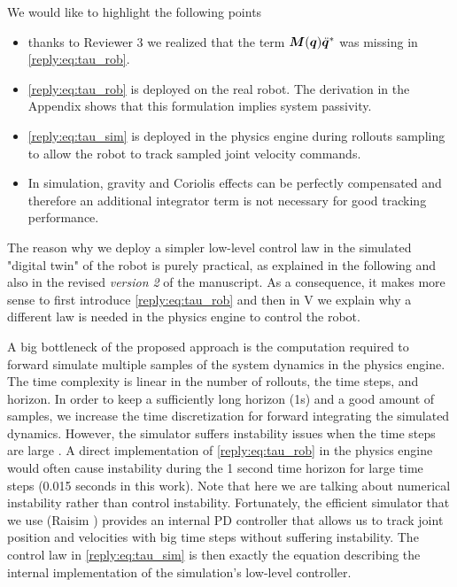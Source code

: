 \documentclass[10pt]{article}
\newcommand{\version}[1]{\textit{version #1}}
\begin{document}
\begin{enumerate}[label={[E:\,\arabic{enumi}]}]
We would like to highlight the following points
\begin{itemize}
    \item thanks to Reviewer 3 we realized that the term $\bm{M}(\bm{q})\ddot{\bm{q}}^*$ was missing in \eqref{reply:eq:tau_rob}. 
    \item \eqref{reply:eq:tau_rob} is deployed on the real robot. The derivation in the Appendix shows that this formulation implies system passivity.
    \item \eqref{reply:eq:tau_sim} is deployed in the physics engine during rollouts sampling to allow the robot to track sampled joint velocity commands. 
    \item  In simulation, gravity and Coriolis effects can be perfectly compensated and therefore an additional integrator term is not necessary for good tracking performance.
\end{itemize}

The reason why we deploy a simpler low-level control law in the simulated "digital twin" of the robot is purely practical, as explained in the following and also in the revised \version{2} of the manuscript. As a consequence, it makes more sense to first introduce \eqref{reply:eq:tau_rob} and then in \sect V we explain why a different law is needed in the physics engine to control the robot. 

A big bottleneck of the proposed approach is the computation required to forward simulate multiple samples of the system dynamics in the physics engine. The time complexity is linear in the number of rollouts, the time steps, and horizon. In order to keep a sufficiently long horizon (1s) and a good amount of samples, we increase the time discretization for forward integrating the simulated dynamics. However, the simulator suffers instability issues when the time steps are large \cite{erez2015simulation}. A direct implementation of \eqref{reply:eq:tau_rob} in the physics engine would often cause instability during the 1 second time horizon for large time steps (0.015 seconds in this work). Note that here we are talking about numerical instability rather than control instability. Fortunately, the efficient simulator that we use (Raisim \cite{raisim}) provides an internal PD controller \cite{raisim_pd} that allows us to track joint position and velocities with big time steps without suffering instability. The control law in \eqref{reply:eq:tau_sim} is then exactly the equation describing the internal implementation of the simulation's low-level controller. 


\end{enumerate}
\end{document}
